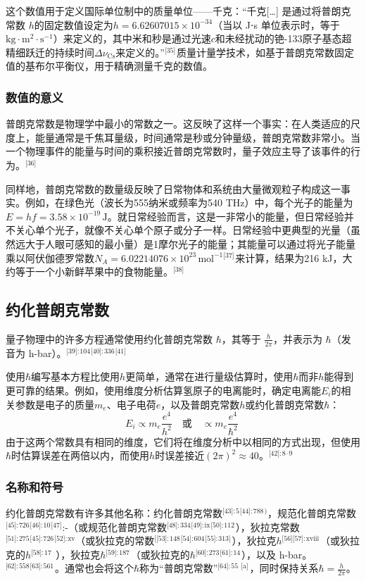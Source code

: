 这个数值用于定义国际单位制中的质量单位——千克：“千克[…] 是通过将普朗克常数 \(h\)的固定数值设定为\( h = 6.62607015 \times 10^{-34}\)（当以 J⋅s 单位表示时，等于\( \text{kg} \cdot \text{m}^2 \cdot \text{s}^{-1}\)）来定义的，其中米和秒是通过光速\(c\)和未经扰动的铯-133原子基态超精细跃迁的持续时间\(\Delta \nu_{\text{Cs}}\)来定义的。”\(^\text{[35] }\)质量计量学技术，如基于普朗克常数固定值的基布尔平衡仪，用于精确测量千克的数值。
\subsubsection{数值的意义}  
普朗克常数是物理学中最小的常数之一。这反映了这样一个事实：在人类适应的尺度上，能量通常是千焦耳量级，时间通常是秒或分钟量级，普朗克常数非常小。当一个物理事件的能量与时间的乘积接近普朗克常数时，量子效应主导了该事件的行为。\(^\text{[36] }\)

同样地，普朗克常数的数量级反映了日常物体和系统由大量微观粒子构成这一事实。例如，在绿色光（波长为555纳米或频率为540 THz）中，每个光子的能量为\( E = hf = 3.58 \times 10^{-19} \, \text{J} \)。就日常经验而言，这是一非常小的能量，但日常经验并不关心单个光子，就像不关心单个原子或分子一样。日常经验中更典型的光量（虽然远大于人眼可感知的最小量）是1摩尔光子的能量；其能量可以通过将光子能量乘以阿伏伽德罗常数\( N_A = 6.02214076 \times 10^{23} \, \text{mol}^{-1} \)\(^\text{[37] }\)来计算，结果为216 kJ，大约等于一个小新鲜苹果中的食物能量。\(^\text{[38] }\)
\subsection{约化普朗克常数}  
量子物理中的许多方程通常使用约化普朗克常数 \( \hbar \)，其等于 \( \frac{h}{2\pi} \)，并表示为 \( \hbar \)（发音为 h-bar）。\(^\text{[39]: 104 [40]: 336 [41] }\)

使用\( \hbar \)编写基本方程比使用\( h \)更简单，通常在进行量级估算时，使用\( \hbar \)而非\( h \)能得到更可靠的结果。例如，使用维度分析估算氢原子的电离能时，确定电离能\( E_i \)的相关参数是电子的质量\( m_e \)、电子电荷\( e \)，以及普朗克常数\( h \)或约化普朗克常数\( \hbar \)：
\[
E_i \propto m_e \frac{e^4}{h^2} \quad \text{或} \quad \propto m_e \frac{e^4}{\hbar^2}~
\]
由于这两个常数具有相同的维度，它们将在维度分析中以相同的方式出现，但使用\( \hbar \)时估算误差在两倍以内，而使用\( h \)时误差接近\( (2\pi)^2 \approx 40 \)。\(^\text{[42]: 8–9 }\)
\subsubsection{名称和符号}  
约化普朗克常数有许多其他名称：约化普朗克常数\(^\text{[43]: 5 [44]: 788 )}\)，规范化普朗克常数\(^\text{[45]: 726 [46]: 10 [47]}\):-（或规范化普朗克常数\(^\text{[48]: 334 [49]: ix [50]: 112 }\)），狄拉克常数\(^\text{[51]: 275 [45]: 726 [52]: xv}\)（或狄拉克的常数\(^\text{[[53]: 148 [54]: 604 [55]: 313] }\)），狄拉克\(h\)\(^\text{[56][57]: xviii }\)（或狄拉克的\(h\)\(^\text{[58]: 17 }\) ），狄拉克\(\hbar\)\(^\text{[59]: 187 }\)（或狄拉克的\( \hbar\)\(^\text{[60]: 273 [61]: 14 }\)），以及 h-bar。\(^\text{[62]: 558 [63]: 561 }\)。通常也会将这个\(\hbar\)称为“普朗克常数”\(^\text{[64]: 55  [a] }\)，同时保持关系\(\hbar = \frac{h}{2\pi} \)。

